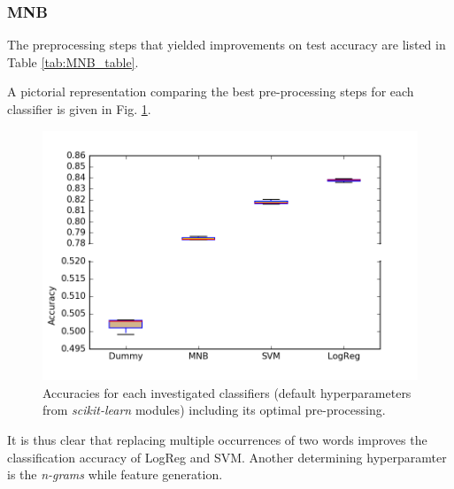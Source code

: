 \subsubsection{MNB}
The preprocessing steps that yielded improvements on test accuracy are listed in Table \ref{tab:MNB_table}.
\begin{table}[H]
\centering
{}
\caption{\label{tab:MNB_table}Best pre-processing steps for default MNB.}
\end{table}
A pictorial representation comparing the best pre-processing steps for each classifier is given in Fig. \ref{fig:classifiers}.
\begin{figure}[H]
	\centering
	\includegraphics[width=\columnwidth]{plots/Classifiers_boxplots2.png}
    \caption{Accuracies for each investigated classifiers (default hyperparameters from \textit{scikit-learn} modules) including its optimal pre-processing.}
    \label{fig:classifiers}
\end{figure}
It is thus clear that replacing multiple occurrences of two words improves the classification accuracy of LogReg and SVM. Another determining hyperparamter is the \textit{n-grams} while feature generation. 
